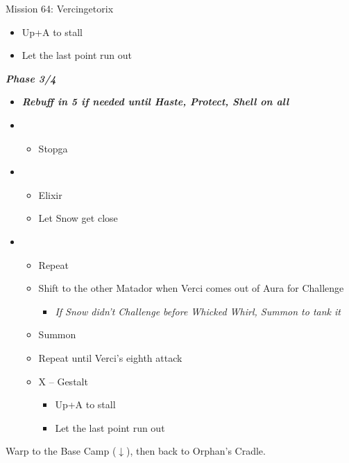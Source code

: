 \begin{battle}{Mission 64: Vercingetorix}
\begin{itemize}
\begin{itemize}
\begin{itemize}
						\item Up+A to stall
						\item Let the last point run out
					\end{itemize}
			\end{itemize}
	\end{itemize}
	\textit{\textbf{Phase 3/4}}
	\begin{itemize}
		\item \textit{\textbf{Rebuff in 5 if needed until Haste, Protect, Shell on all}}
		\item \fifth
			\begin{itemize}
				\item Stopga
			\end{itemize}
		\item \second
			\begin{itemize}
				\item Elixir
				\item Let Snow get close
			\end{itemize}
		\item \third
			\begin{itemize}
				\item Repeat
				\item Shift to the other Matador when Verci comes out of Aura for Challenge
					\begin{itemize}
						\item \textit{If Snow didn't Challenge before Whicked Whirl, Summon to tank it}
					\end{itemize}
				\item Summon
				\item Repeat until Verci's eighth attack
				\item X -- Gestalt
					\begin{itemize}
						\item Up+A to stall
						\item Let the last point run out
					\end{itemize}
			\end{itemize}
	\end{itemize}
\end{battle}

Warp to the Base Camp ($\downarrow$), then back to Orphan's Cradle.
\vfill\null
\columnbreak
